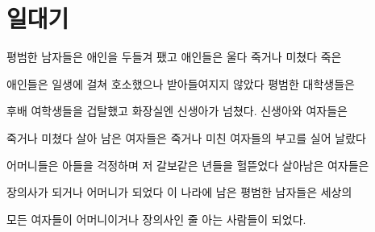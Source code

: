 \hypertarget{uxc77cuxb300uxae30}{%

\section{일대기}\label{uxc77cuxb300uxae30}}



평범한 남자들은 애인을 두들겨 팼고 애인들은 울다 죽거나 미쳤다 죽은

애인들은 일생에 걸쳐 호소했으나 받아들여지지 않았다 평범한 대학생들은

후배 여학생들을 겁탈했고 화장실엔 신생아가 넘쳤다. 신생아와 여자들은

죽거나 미쳤다 살아 남은 여자들은 죽거나 미친 여자들의 부고를 실어 날랐다

어머니들은 아들을 걱정하며 저 갈보같은 년들을 헐뜯었다 살아남은 여자들은

장의사가 되거나 어머니가 되었다 이 나라에 남은 평범한 남자들은 세상의

모든 여자들이 어머니이거나 장의사인 줄 아는 사람들이 되었다.


